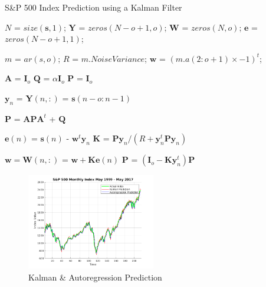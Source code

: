 \documentclass[11pt, fleqn]{article}
\begin{document}
\begin{algorithm}[H]
\caption{S\&P 500 Index Prediction using a Kalman Filter}
\label{alg:kalman}
\begin{algorithmic}[1]

 

\State

\State $N$ = $size(\bm{s}, 1)$; 
\State $\bm{Y}$ = $zeros(N - o + 1, o)$; 
\State $\bm{W}$ = $zeros(N, o)$; 
\State $\bm{e}$ = $zeros(N - o + 1, 1)$; 

\State

\State $m$ = $ar(s, o)$; 
\State $R$ = $m.NoiseVariance$; 
\State $\bm{w}$ = $(m.a(2:o+1) \times -1)^t$; 

\State

\State $\bm{A}$ = $\bm{I}_o$ 
\State $\bm{Q}$ = $\alpha\bm{I}_o$ 
\State $\bm{P}$ = $\bm{I}_o$ 

\State


	\State $\bm{y}_n$ = $\bm{Y}(n, :)$ = $\bm{s}(n - o:n - 1)$ 

	\State

	\State $\bm{P}$ = $\bm{A}\bm{P}\bm{A}^t$ + $\bm{Q}$ 

	\State
	
	\State $\bm{e}(n)$ = $\bm{s}(n)$ - $\bm{w}^t\bm{y}_n$ 
	\State $\bm{K}$ = $\bm{P}\bm{y}_n/(R + \bm{y}_n^t\bm{P}\bm{y}_n)$ 

	\State

	\State $\bm{w} = \bm{W}(n, :)$ = $\bm{w} + \bm{K}\bm{e}(n)$ 
	\State $\bm{P}$ = $(\bm{I}_o - \bm{K}\bm{y}_n^t)\bm{P}$ 

\EndFor

\EndProcedure
\end{algorithmic}
\end{algorithm}

\begin{figure}
  	\centering
  	\includegraphics[width=0.5\textwidth]{kalman-autoreg-pred.png}
	\caption{Kalman \& Autoregression Prediction}
	\label{fig:kalman-autoreg-pred}
\end{figure}
\end{document}

